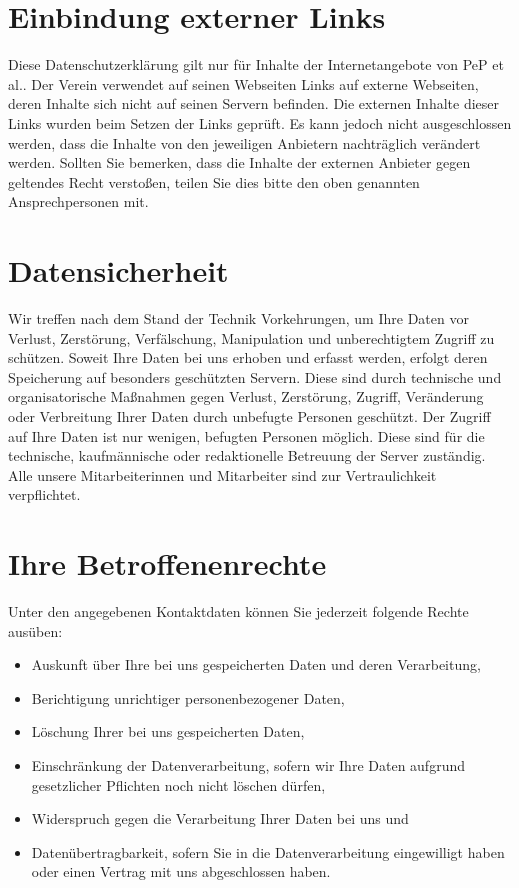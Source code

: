 \documentclass[
  fontsize=12pt,
  paper=a4,
  DIV14,
  parskip,
]{scrartcl}
\begin{document}
\section{Einbindung externer Links}

Diese Datenschutzerklärung gilt nur für Inhalte der Internetangebote von PeP
et al.. Der Verein verwendet auf seinen Webseiten Links auf externe
Webseiten, deren Inhalte sich nicht auf seinen Servern befinden.
Die externen Inhalte dieser Links wurden beim Setzen der Links geprüft.
Es kann jedoch nicht ausgeschlossen werden, dass die Inhalte von den
jeweiligen Anbietern nachträglich verändert werden.
Sollten Sie bemerken, dass die Inhalte der externen Anbieter gegen geltendes
Recht verstoßen, teilen Sie dies bitte den oben genannten Ansprechpersonen
mit.

\section{Datensicherheit}

Wir treffen nach dem Stand der Technik Vorkehrungen, um Ihre Daten vor
Verlust, Zerstörung, Verfälschung, Manipulation und unberechtigtem Zugriff zu
schützen.
Soweit Ihre Daten bei uns erhoben und erfasst werden, erfolgt deren
Speicherung auf besonders geschützten Servern. Diese sind durch technische
und organisatorische Maßnahmen gegen Verlust, Zerstörung, Zugriff,
Veränderung oder Verbreitung Ihrer Daten durch unbefugte Personen geschützt.
Der Zugriff auf Ihre Daten ist nur wenigen, befugten Personen möglich. Diese
sind für die technische, kaufmännische oder redaktionelle Betreuung der
Server zuständig. Alle unsere Mitarbeiterinnen und Mitarbeiter sind zur
Vertraulichkeit verpflichtet.

\section{Ihre Betroffenenrechte}

Unter den angegebenen Kontaktdaten können Sie jederzeit folgende Rechte
ausüben:

\begin{itemize}
  \item Auskunft über Ihre bei uns gespeicherten Daten und deren Verarbeitung,
  \item Berichtigung unrichtiger personenbezogener Daten,
  \item Löschung Ihrer bei uns gespeicherten Daten,
  \item Einschränkung der Datenverarbeitung, sofern wir Ihre Daten aufgrund
        gesetzlicher Pflichten noch nicht löschen dürfen,
  \item Widerspruch gegen die Verarbeitung Ihrer Daten bei uns und
  \item Datenübertragbarkeit, sofern Sie in die Datenverarbeitung
        eingewilligt haben oder einen Vertrag mit uns abgeschlossen haben.
\end{itemize}
\end{document}
